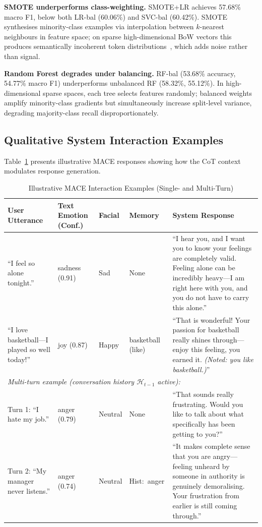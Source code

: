 \documentclass[conference]{IEEEtran}
\begin{document}
\textbf{SMOTE underperforms class-weighting.}
SMOTE+LR achieves 57.68\% macro F1, below both LR-bal
(60.06\%) and SVC-bal (60.42\%).
SMOTE synthesises minority-class examples via interpolation
between $k$-nearest neighbours in feature space; on sparse
high-dimensional BoW vectors this produces semantically
incoherent token distributions~\cite{blagus2013smote},
which adds noise rather than signal.

\textbf{Random Forest degrades under balancing.}
RF-bal (53.68\% accuracy, 54.77\% macro F1) underperforms
unbalanced RF (58.32\%, 55.12\%).
In high-dimensional sparse spaces, each tree selects features
randomly; balanced weights amplify minority-class gradients
but simultaneously increase split-level variance, degrading
majority-class recall disproportionately.

\subsection{Qualitative System Interaction Examples}

Table~\ref{tab:qual} presents illustrative MACE responses
showing how the CoT context modulates response generation.

\begin{table}[htbp]
\centering
\caption{Illustrative MACE Interaction Examples (Single- and Multi-Turn)}
\label{tab:qual}
\begin{tabular}{p{2.6cm}p{2.1cm}p{1.8cm}p{1.6cm}p{5.7cm}}
\toprule
\textbf{User Utterance} & \textbf{Text Emotion (Conf.)} &
\textbf{Facial} & \textbf{Memory} & \textbf{System Response} \\
\midrule
``I feel so alone tonight.'' &
sadness (0.91) & Sad & None &
``I hear you, and I want you to know your feelings are completely
 valid. Feeling alone can be incredibly heavy---I am right
 here with you, and you do not have to carry this alone.'' \\
\addlinespace
``I love basketball---I played so well today!'' &
joy (0.87) & Happy & basketball (like) &
``That is wonderful! Your passion for basketball really shines
 through---enjoy this feeling, you earned it.
 \emph{(Noted: you like basketball.)}'' \\
\midrule
\multicolumn{5}{l}{\textit{Multi-turn example (conversation
history $\mathcal{H}_{t-1}$ active):}}\\[2pt]
Turn 1: ``I hate my job.'' &
anger (0.79) & Neutral & None &
``That sounds really frustrating. Would you like to talk about
 what specifically has been getting to you?'' \\
Turn 2: ``My manager never listens.'' &
anger (0.74) & Neutral &
\mbox{Hist: anger} &
``It makes complete sense that you are angry---feeling unheard
 by someone in authority is genuinely demoralising.
 Your frustration from earlier is still coming through.'' \\
\bottomrule
\end{tabular}
\end{table}
\end{document}
